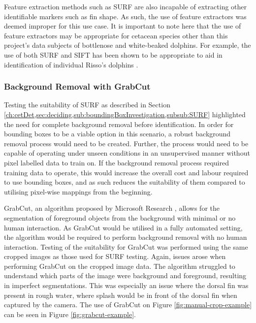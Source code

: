 Feature extraction methods such as SURF are also incapable of extracting other identifiable markers such as fin shape. As such, the use of feature extractors was deemed improper for this use case. It is important to note here that the use of feature extractors may be appropriate for cetacean species other than this project's data subjects of bottlenose and white-beaked dolphins. For example, the use of both SURF and SIFT has been shown to be appropriate to aid in identification of individual Risso's dolphins \cite{reno_sift-based_2019, maglietta_dolfin_2018}.

\subsubsection{Background Removal with GrabCut}\label{ch:cetDet,sec:deciding,sub:boundingBoxInvestigation,subsub:GrabCut}

Testing the suitability of SURF as described in Section \ref{ch:cetDet,sec:deciding,sub:boundingBoxInvestigation,subsub:SURF} highlighted the need for complete background removal before identification. In order for bounding boxes to be a viable option in this scenario, a robust background removal process would need to be created. Further, the process would need to be capable of operating under unseen conditions in an unsupervised manner without pixel labelled data to train on. If the background removal process required training data to operate, this would increase the overall cost and labour required to use bounding boxes, and as such reduces the suitability of them compared to utilising pixel-wise mappings from the beginning.

GrabCut, an algorithm proposed by Microsoft Research \cite{rother_grabcut_2004}, allows for the segmentation of foreground objects from the background with minimal or no human interaction. As GrabCut would be utilised in a fully automated setting, the algorithm would be required to perform background removal with no human interaction. Testing of the suitability for GrabCut was performed using the same cropped images as those used for SURF testing. Again, issues arose when performing GrabCut on the cropped image data. The algorithm struggled to understand which parts of the image were background and foreground, resulting in imperfect segmentations. This was especially an issue where the dorsal fin was present in rough water, where splash would be in front of the dorsal fin when captured by the camera. The use of GrabCut on Figure \ref{fig:manual-crop-example} can be seen in Figure \ref{fig:grabcut-example}.

